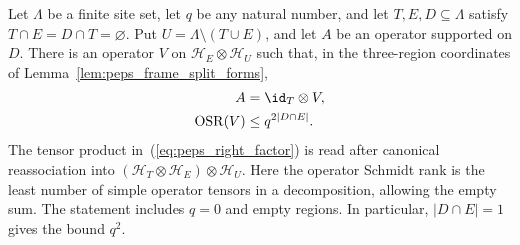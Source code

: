 \begin{lemma}
    \label{thm:peps_supported_right_factor_rank}
    \leanok
    Let $\Lambda$ be a finite site set, let $q$ be any natural number, and
    let $T,E,D\subseteq\Lambda$ satisfy $T\cap E=D\cap T=\varnothing$.
    Put $U=\Lambda\setminus(T\cup E)$, and let $A$ be an operator supported
    on $D$. There is an operator $V$ on $\mathcal H_E\otimes\mathcal H_U$
    such that, in the three-region coordinates of
    Lemma~\ref{lem:peps_frame_split_forms},
    \begin{align}
        A                     & =\id_T\otimes V,\notag                          \\
        \operatorname{OSR}(V) & \le q^{2|D\cap E|}.\label{eq:peps_right_factor}
    \end{align}
    The tensor product in~(\ref{eq:peps_right_factor}) is read after canonical reassociation into
    $(\mathcal H_T\otimes\mathcal H_E)\otimes\mathcal H_U$.
    Here the operator Schmidt rank is the least number of simple operator
    tensors in a decomposition, allowing the empty sum. The statement
    includes $q=0$ and empty regions. In particular, $|D\cap E|=1$ gives
    the bound $q^2$.
\end{lemma}
